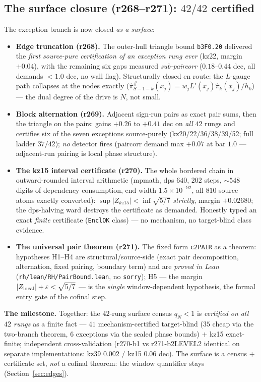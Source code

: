 \documentclass[11pt]{article}
\theoremstyle{definition}
\theoremstyle{remark}
\begin{document}
\subsection{The surface closure (r268--r271): $42/42$ certified}
\label{sec:surface}
The exception branch is now closed \emph{as a surface}:
\begin{itemize}[leftmargin=2em]
\item \textbf{Edge truncation (r268).}  The outer-hull triangle bound
\texttt{b3F0.20} delivered the \emph{first source-pure certification of an
exception rung ever} (kz22, margin $+0.04$), with the remaining six gaps
measured \emph{sub-paircorr} ($0.18$--$0.44$ dec, all demands $<1.0$ dec,
no wall flag).  Structurally closed en route: the $L$-gauge path collapses
at the nodes exactly ($\hat\pi^{\#}_{S-1-k}(x_j)=w_jL'(x_j)\hat\pi_k(x_j)/
h_k$) --- the dual degree of the drive is $N$, not small.
\item \textbf{Block alternation (r269).}  Adjacent sign-run pairs as exact
pair sums, then the triangle on the pairs: gains $+0.26$ to $+0.41$ dec on
\emph{all} $42$ rungs and certifies six of the seven exceptions
source-purely (kz20/22/36/38/39/52; full ladder $37/42$); \emph{no}
detector fires (paircorr demand max $+0.07$ at bar $1.0$ --- adjacent-run
pairing is local phase structure).
\item \textbf{The kz15 interval certificate (r270).}  The whole bordered
chain in outward-rounded interval arithmetic (mpmath, dps $640$, $202$
steps, ${\sim}548$ digits of dependency consumption, end width
$1.5\times10^{-92}$, all $810$ source atoms exactly converted):
$\sup|Z_{kz15}|<\inf\sqrt{5/7}$ \emph{strictly}, margin $+0.02680$; the
dps-halving ward destroys the certificate as demanded.  Honestly typed an
exact \emph{finite} certificate (\texttt{EnclOK} class) --- no mechanism,
no target-blind class evidence.
\item \textbf{The universal pair theorem (r271).}  The fixed form
\texttt{c2PAIR} as a theorem: hypotheses H1--H4 are structural/source-side
(exact pair decomposition, alternation, fixed pairing, boundary term) and
are \emph{proved in Lean} (\texttt{rh/lean/RH/PairBound.lean}, no
\texttt{sorry}); H5 --- the margin $|Z_{\rm local}|+\varepsilon<\sqrt{5/7}$
--- is the \emph{single} window-dependent hypothesis, the formal entry
gate of the cofinal step.
\end{itemize}

\noindent\textbf{The milestone.}  Together: the $42$-rung surface census
$q_N<1$ is \emph{certified on all $42$ rungs} as a finite fact ---
$41$ mechanism-certified target-blind ($35$ cheap via the two-branch
theorem, $6$ exceptions via the sealed phase bounds) $+$ kz15
exact-finite; independent cross-validation (r270-b1 vs r271-b2LEVEL2
identical on separate implementations: kz39 $0.002$ / kz15 $0.06$ dec).
The surface is a census $+$ certificate set, \emph{not} a cofinal
theorem: the window quantifier stays (Section~\ref{sec:edges}).
\end{document}
